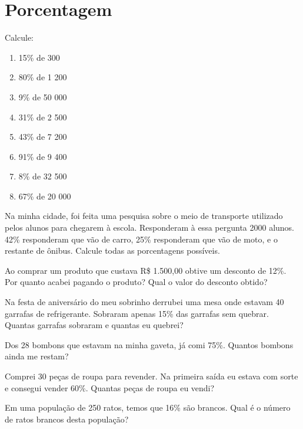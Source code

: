 \chapter{Porcentagem}

\item Calcule:
\begin{multicols}{4}
\begin{enumerate}
	\item 15\% de 300
	\item 80\% de 1 200 
	\item 9\% de 50 000
	\item 31\% de 2 500 
	\item 43\% de 7 200 
	\item 91\% de 9 400
	\item 8\% de 32 500
	\item 67\% de 20 000 
\end{enumerate}
\end{multicols}

\item Na minha cidade, foi feita uma pesquisa sobre o meio de transporte utilizado pelos alunos para chegarem  à  escola. Responderam  à  essa  pergunta  2000  alunos.  42\%  responderam  que  vão  de  carro,  25\% responderam que vão de moto, e o restante de ônibus. Calcule todas as porcentagens possíveis. 

\item Ao  comprar  um  produto  que  custava  R\$ 1.500,00  obtive  um  desconto  de  12\%.  Por  quanto acabei pagando o produto? Qual o valor do desconto obtido?

\item Na  festa  de  aniversário  do  meu  sobrinho  derrubei  uma  mesa  onde  estavam  40  garrafas  de refrigerante.  Sobraram  apenas  15\%  das  garrafas  sem quebrar.  Quantas  garrafas  sobraram  e  quantas  eu quebrei?

\item Dos  28  bombons  que  estavam  na  minha  gaveta,  já  comi   75\%.  Quantos  bombons  ainda  me restam?

\item Comprei  30 peças  de roupa  para revender.  Na primeira  saída  eu  estava  com  sorte  e  consegui vender 60\%. Quantas peças de roupa eu vendi?     

\item Em  uma  população  de  250  ratos,  temos  que  16\%  são  brancos.  Qual  é  o  número  de  ratos brancos desta população?

